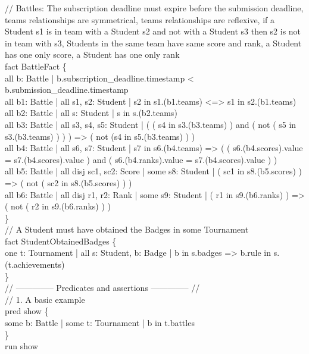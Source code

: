 \documentclass{Configuration_Files/Template}
\begin{document}
// Battles: The subscription deadline must expire before the submission deadline, teams relationships are symmetrical, teams relationships are reflexive, if a Student s1 is in team with a Student s2 and not with a Student s3 then s2 is not in team with s3, Students in the same team have same score and rank, a Student has one only score, a Student has one only rank\\

fact BattleFact \{\\
    all b: Battle | b.subscription\_deadline.timestamp < b.submission\_deadline.timestamp\\
    all b1: Battle | all s1, s2: Student | s2 in s1.(b1.teams) <=> s1 in s2.(b1.teams)\\
    all b2: Battle | all s: Student | s in s.(b2.teams)\\
    all b3: Battle | all s3, s4, s5: Student | ( ( s4 in s3.(b3.teams) )  and ( not ( s5 in s3.(b3.teams) ) ) ) => ( not (s4 in s5.(b3.teams) ) )\\
    all b4: Battle | all s6, s7: Student | s7 in s6.(b4.teams) => ( ( s6.(b4.scores).value = s7.(b4.scores).value ) and ( s6.(b4.ranks).value = s7.(b4.scores).value ) )\\
    all b5: Battle | all disj sc1, sc2: Score | some s8: Student | ( sc1 in s8.(b5.scores) ) => ( not ( sc2 in s8.(b5.scores) ) )\\
    all b6: Battle | all disj r1, r2: Rank | some s9: Student | ( r1 in s9.(b6.ranks) ) => ( not ( r2 in s9.(b6.ranks) ) )\\
\}\\

// A Student must have obtained the Badges in some Tournament\\

fact StudentObtainedBadges \{\\
one t: Tournament | all s: Student, b: Badge | b in s.badges => b.rule in s.(t.achievements)\\
\}\\

// -------------- Predicates and assertions -------------- //\\

//  1. A basic example\\

pred show \{\\
some b: Battle | some t: Tournament | b in t.battles\\
\}\\
run show\\
\end{document}
